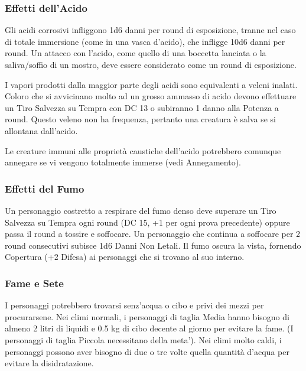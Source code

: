 \documentclass[a4paper,11pt,twoside,openany]{book}
\begin{document}
\subsubsection{Effetti dell'Acido}

\label{effetti-dellacido}

Gli acidi corrosivi infliggono 1d6 danni per round di esposizione, tranne nel caso di totale immersione (come in una vasca d'acido), che infligge 10d6 danni per round. Un attacco con l'acido, come quello di una boccetta lanciata o la saliva/soffio di un mostro, deve essere considerato come un round di esposizione.

I vapori prodotti dalla maggior parte degli acidi sono equivalenti a veleni inalati. Coloro che si avvicinano molto ad un grosso ammasso di acido devono effettuare un Tiro Salvezza su Tempra con DC 13 o subiranno 1 danno alla Potenza a round. Questo veleno non ha frequenza, pertanto una creatura è salva se si allontana dall'acido.

Le creature immuni alle proprietà caustiche dell'acido potrebbero comunque annegare se vi vengono totalmente immerse (vedi Annegamento).

\subsubsection{Effetti del Fumo}

\label{effetti-del-fumo}

Un personaggio costretto a respirare del fumo denso deve superare un Tiro Salvezza su Tempra ogni round (DC 15, +1 per ogni prova precedente) oppure passa il round a tossire e soffocare. Un personaggio che continua a soffocare per 2 round consecutivi subisce 1d6 Danni Non Letali. Il fumo oscura la vista, fornendo Copertura (+2 Difesa) ai personaggi che si trovano al suo interno.

\subsubsection{Fame e Sete}

\label{fame-e-sete}

I personaggi potrebbero trovarsi senz'acqua o cibo e privi dei mezzi per procurarsene. Nei climi normali, i personaggi di taglia Media hanno bisogno di almeno 2 litri di liquidi e 0.5 kg di cibo decente al giorno per evitare la fame. (I personaggi di taglia Piccola necessitano della meta'). Nei climi molto caldi, i personaggi possono aver bisogno di due o tre volte quella quantità d'acqua per evitare la disidratazione.
\end{document}

